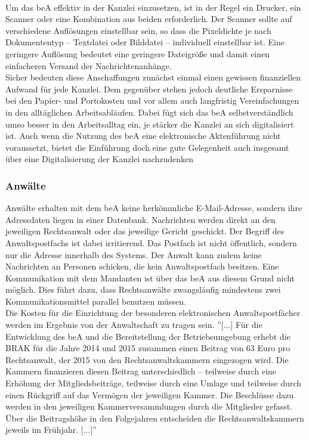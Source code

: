 \\
Um das beA effektiv in der Kanzlei einzusetzen, ist in der Regel ein Drucker, ein Scanner oder eine Kombination aus beiden erforderlich. Der Scanner sollte auf verschiedene Auflösungen einstellbar sein, so dass die Pixeldichte je nach Dokumententyp – Textdatei oder Bilddatei – individuell einstellbar ist. Eine geringere Auflösung bedeutet eine geringere Dateigröße und damit einen einfacheren Versand der Nachrichtenanhänge. \\
Sicher bedeuten diese Anschaffungen zunächst einmal einen gewissen finanziellen Aufwand für jede Kanzlei. Dem gegenüber stehen jedoch deutliche Ersparnisse bei den Papier- und Portokosten und vor allem auch langfristig Vereinfachungen in den alltäglichen Arbeitsabläufen. Dabei fügt sich das beA selbstverständlich umso besser in den Arbeitsalltag ein, je stärker die Kanzlei an sich digitalisiert ist. Auch wenn die Nutzung des beA eine elektronische Aktenführung nicht voraussetzt, bietet die Einführung doch eine gute Gelegenheit auch insgesamt über eine Digitalisierung der Kanzlei nachzudenken

\subsubsection{Anwälte}
Anwälte erhalten mit dem beA keine herkömmliche E-Mail-Adresse, sondern ihre Adressdaten liegen in einer Datenbank. Nachrichten werden direkt an den jeweiligen Rechtsanwalt oder das jeweilige Gericht geschickt.
Der Begriff des Anwaltspostfachs ist dabei irritierend. Das Postfach ist nicht öffentlich, sondern nur die Adresse innerhalb des Systems. Der Anwalt kann zudem keine Nachrichten an Personen schicken, die kein Anwaltspostfach besitzen. Eine Kommunikation mit dem Mandanten ist über das beA aus diesem Grund nicht möglich. Dies führt dazu, dass Rechtsanwälte zwangsläufig mindestens zwei Kommunikationsmittel parallel benutzen müssen. \\
Die Kosten für die Einrichtung der besonderen elektronischen Anwaltspostfächer werden im Ergebnis von der Anwaltschaft zu tragen sein. ''[...] Für die Entwicklung des beA und die Bereitstellung der Betriebsumgebung erhebt die BRAK für die Jahre 2014 und 2015 zusammen einen Beitrag von 63 Euro pro Rechtsanwalt, der 2015 von den Rechtsanwaltskammern eingezogen wird. Die Kammern finanzieren diesen Beitrag unterschiedlich – teilweise durch eine Erhöhung der Mitgliedsbeiträge, teilweise durch eine Umlage und teilweise durch einen Rückgriff auf das Vermögen der jeweiligen Kammer. Die Beschlüsse dazu werden in den jeweiligen Kammerversammlungen durch die Mitglieder gefasst. Über die Beitragshöhe in den Folgejahren entscheiden die Rechtsanwaltskammern jeweils im Frühjahr. [...]'' \textcite{bea:bea:brak}

